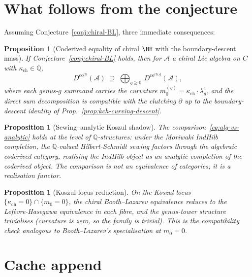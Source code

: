 \documentclass[11pt]{amsart}
\newtheorem{proposition}[theorem]{Proposition}
\newcommand{\kch}{\kappa_{\mathrm{ch}}}
\newcommand{\cA}{\mathcal{A}}
\newcommand{\Dco}{D^{\mathrm{co}}}
\begin{document}
\section{What follows from the conjecture}
\label{sec:consequences}

Assuming Conjecture~\ref{conj:chiral-BL}, three immediate consequences:

\begin{proposition}[Coderived equality of chiral $\HH$ with the
boundary-descent mass]
If Conjecture~\ref{conj:chiral-BL} holds, then for $\cA$ a chiral
Lie algebra on $C$ with $\kch\in\mathbb{Q}$,
\[
\Dco^{\mathrm{ch}}(\cA)\;\supseteq\;\bigoplus_{g\geq 0}\,
\Dco^{\mathrm{ch},g}(\cA),
\]
where each genus-$g$ summand carries the curvature
$m_0^{(g)}=\kch\cdot\lambda_g^{1}$, and the direct sum decomposition
is \emph{compatible} with the clutching $\partial$ up to the
boundary-descent identity of Prop.~\ref{prop:kch-curving-descent}.
\end{proposition}

\begin{proposition}[Sewing--analytic Koszul shadow]
The comparison~\eqref{eq:alg-vs-analytic} holds at the level of
$\mathbb{Q}$-structures: under the Moriwaki IndHilb completion, the
$\mathbb{Q}$-valued Hilbert-Schmidt sewing factors through the
algebraic coderived category, realising the IndHilb object as an
analytic completion of the coderived object. The comparison is not
an equivalence of categories; it is a realisation functor.
\end{proposition}

\begin{proposition}[Koszul-locus reduction]
On the Koszul locus $\{\kch=0\}\cap\{m_0=0\}$, the chiral
Booth--Lazarev equivalence reduces to the Lef\`evre-Hasegawa
equivalence in each fibre, and the genus-tower structure trivialises
(curvature is zero, so the family is trivial). This is the
compatibility check analogous to Booth--Lazarev's specialisation
at $m_0=0$.
\end{proposition}

\section{Cache append}
\label{sec:cache}
\end{document}
